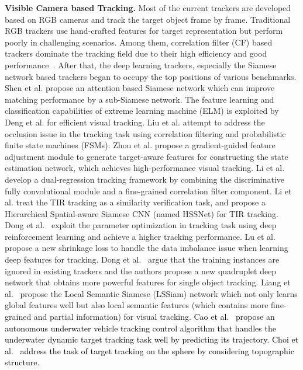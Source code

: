 \documentclass[journal]{IEEEtran}
\begin{document}
\noindent 
\textbf{Visible Camera based Tracking. }
Most of the current trackers are developed based on RGB cameras and track the target object frame by frame. Traditional RGB trackers use hand-crafted features for target representation but perform poorly in challenging scenarios. Among them, correlation filter (CF) based trackers dominate the tracking field due to their high efficiency and good performance~\cite{han2019STCATrack, han2019stateDriftTrack, han2017adaTrack}. After that, the deep learning trackers, especially the Siamese network based trackers began to occupy the top positions of various benchmarks. Shen et al. \cite{shen2019trackSiamHier} propose an attention based Siamese network which can improve matching performance by a sub-Siamese network. The feature learning and classification capabilities of extreme learning machine (ELM) is exploited by Deng et al. \cite{Deng2020ELMF} for efficient visual tracking. Liu et al. \cite{Liu2020FSMs} attempt to address the occlusion issue in the tracking task using correlation filtering and probabilistic finite state machines (FSMs). Zhou et al. \cite{Zhou2022TargetTrack} propose a gradient-guided feature adjustment module to generate target-aware features for constructing the state estimation network, which achieves high-performance visual tracking. Li et al. \cite{li2020dualregressTrack} develop a dual-regression tracking framework by combining the discriminative fully convolutional module and a fine-grained correlation filter component. Li et al. \cite{li2019hierarchicalSASiam} treat the TIR tracking as a similarity verification task, and propose a Hierarchical Spatial-aware Siamese CNN (named HSSNet) for TIR tracking. Dong et al.~\cite{dong2019hyperparamdrl} exploit the parameter optimization in tracking task using deep reinforcement learning and achieve a higher tracking performance. Lu et al.~\cite{lu2022deepShrinkageloss} propose a new shrinkage loss to handle the data imbalance issue when learning deep features for tracking. Dong et al.~\cite{dong2019quadruplet} argue that the training instances are ignored in existing trackers and the authors propose a new quadruplet deep network that obtains more powerful features for single object tracking. Liang et al.~\cite{liang2019localsemanticSiam} propose the Local Semantic Siamese (LSSiam) network which not only learns global features well but also local semantic features (which contains more fine-grained and partial information) for visual tracking. 
\textcolor{black}{
Cao et al.~\cite{cao2023trackcontrol} propose an autonomous underwater vehicle tracking control algorithm that handles the underwater dynamic target tracking task well by predicting its trajectory. 
Choi et al.~\cite{choi2023SphereTracking} address the task of target tracking on the sphere by considering topographic structure. 
}
\end{document}
